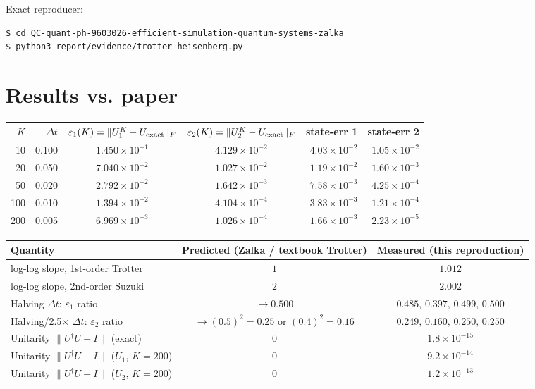 \documentclass[11pt]{article}
\begin{document}
Exact reproducer:
\begin{lstlisting}
$ cd QC-quant-ph-9603026-efficient-simulation-quantum-systems-zalka
$ python3 report/evidence/trotter_heisenberg.py
\end{lstlisting}

\section{Results vs. paper}

\begin{center}
\small
\begin{tabular}{rrccrr}
\toprule
$K$ & $\Delta t$ & $\varepsilon_1(K)=\|U_1^K-U_{\rm exact}\|_F$ &
$\varepsilon_2(K)=\|U_2^K-U_{\rm exact}\|_F$ &
state-err 1 & state-err 2 \\
\midrule
 10 & 0.100 & $1.450\times 10^{-1}$ & $4.129\times 10^{-2}$ & $4.03\times 10^{-2}$ & $1.05\times 10^{-2}$ \\
 20 & 0.050 & $7.040\times 10^{-2}$ & $1.027\times 10^{-2}$ & $1.19\times 10^{-2}$ & $1.60\times 10^{-3}$ \\
 50 & 0.020 & $2.792\times 10^{-2}$ & $1.642\times 10^{-3}$ & $7.58\times 10^{-3}$ & $4.25\times 10^{-4}$ \\
100 & 0.010 & $1.394\times 10^{-2}$ & $4.104\times 10^{-4}$ & $3.83\times 10^{-3}$ & $1.21\times 10^{-4}$ \\
200 & 0.005 & $6.969\times 10^{-3}$ & $1.026\times 10^{-4}$ & $1.66\times 10^{-3}$ & $2.23\times 10^{-5}$ \\
\bottomrule
\end{tabular}
\end{center}

\begin{center}
\begin{tabular}{lcc}
\toprule
Quantity & Predicted (Zalka / textbook Trotter) & Measured (this reproduction) \\
\midrule
log-log slope, 1st-order Trotter & $1$ & $\mathbf{1.012}$ \\
log-log slope, 2nd-order Suzuki  & $2$ & $\mathbf{2.002}$ \\
Halving $\Delta t$: $\varepsilon_1$ ratio & $\to 0.500$ & $0.485,\,0.397,\,0.499,\,0.500$ \\
Halving/2.5$\times$ $\Delta t$: $\varepsilon_2$ ratio &
  $\to (0.5)^2=0.25$ or $(0.4)^2=0.16$ &
  $0.249,\,0.160,\,0.250,\,0.250$ \\
Unitarity $\|U^\dagger U-I\|$ (exact)   & $0$          & $1.8\times 10^{-15}$ \\
Unitarity $\|U^\dagger U-I\|$ ($U_1$, $K=200$) & $0$   & $9.2\times 10^{-14}$ \\
Unitarity $\|U^\dagger U-I\|$ ($U_2$, $K=200$) & $0$   & $1.2\times 10^{-13}$ \\
\bottomrule
\end{tabular}
\end{center}
\end{document}
